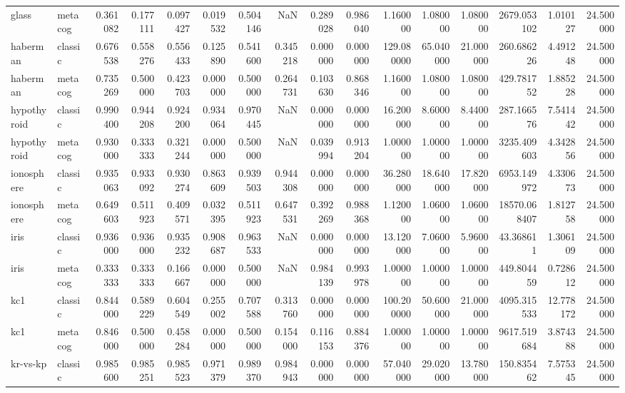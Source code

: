 \begin{tabular}{llrrrrrrrrrrrrrr}
glass & metacog & 0.361082 & 0.177111 & 0.097427 & 0.019532 & 0.504146 & NaN & 0.289028 & 0.986040 & 1.160000 & 1.080000 & 1.080000 & 2679.053102 & 1.010127 & 24.500000 \\
haberman & classic & 0.676538 & 0.558276 & 0.556433 & 0.125890 & 0.541600 & 0.345218 & 0.000000 & 0.000000 & 129.080000 & 65.040000 & 21.000000 & 260.686226 & 4.491248 & 24.500000 \\
haberman & metacog & 0.735269 & 0.500000 & 0.423703 & 0.000000 & 0.500000 & 0.264731 & 0.103630 & 0.868346 & 1.160000 & 1.080000 & 1.080000 & 429.781752 & 1.885228 & 24.500000 \\
hypothyroid & classic & 0.990400 & 0.944208 & 0.924200 & 0.934064 & 0.970445 & NaN & 0.000000 & 0.000000 & 16.200000 & 8.600000 & 8.440000 & 287.166576 & 7.541442 & 24.500000 \\
hypothyroid & metacog & 0.930000 & 0.333333 & 0.321244 & 0.000000 & 0.500000 & NaN & 0.039994 & 0.913204 & 1.000000 & 1.000000 & 1.000000 & 3235.409603 & 4.342856 & 24.500000 \\
ionosphere & classic & 0.935063 & 0.933092 & 0.930274 & 0.863609 & 0.939503 & 0.944308 & 0.000000 & 0.000000 & 36.280000 & 18.640000 & 17.820000 & 6953.149972 & 4.330673 & 24.500000 \\
ionosphere & metacog & 0.649603 & 0.511923 & 0.409571 & 0.032395 & 0.511923 & 0.647531 & 0.392269 & 0.988368 & 1.120000 & 1.060000 & 1.060000 & 18570.068407 & 1.812758 & 24.500000 \\
iris & classic & 0.936000 & 0.936000 & 0.935232 & 0.908687 & 0.963533 & NaN & 0.000000 & 0.000000 & 13.120000 & 7.060000 & 5.960000 & 43.368611 & 1.306109 & 24.500000 \\
iris & metacog & 0.333333 & 0.333333 & 0.166667 & 0.000000 & 0.500000 & NaN & 0.984139 & 0.993978 & 1.000000 & 1.000000 & 1.000000 & 449.804459 & 0.728612 & 24.500000 \\
kc1 & classic & 0.844000 & 0.589229 & 0.604549 & 0.255002 & 0.707588 & 0.313760 & 0.000000 & 0.000000 & 100.200000 & 50.600000 & 21.000000 & 4095.315533 & 12.778172 & 24.500000 \\
kc1 & metacog & 0.846000 & 0.500000 & 0.458284 & 0.000000 & 0.500000 & 0.154000 & 0.116153 & 0.884376 & 1.000000 & 1.000000 & 1.000000 & 9617.519684 & 3.874388 & 24.500000 \\
kr-vs-kp & classic & 0.985600 & 0.985251 & 0.985523 & 0.971379 & 0.989370 & 0.984943 & 0.000000 & 0.000000 & 57.040000 & 29.020000 & 13.780000 & 150.835462 & 7.575345 & 24.500000 \\

\end{tabular}
